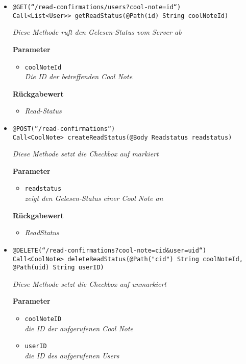     \begin{itemize}
		\item\texttt{{@GET(``/read-confirmations/users?cool-note={id}``) \\ Call<List<User>{}> getReadStatus(@Path(\grqq id\grqq) String coolNoteId)}}

		\textit{Diese Methode ruft den Gelesen-Status vom Server ab}

		\textbf{Parameter} 
			\begin{itemize}
				\item\texttt{coolNoteId}\\
		 		\textit{Die ID der betreffenden Cool Note}
	 		\end{itemize}

		\textbf{Rückgabewert} 
		\begin{itemize}
		\item\textit{Read-Status}
		\end{itemize}

	\item\texttt{{@POST(``/read-confirmations``) \\ Call<CoolNote> createReadStatus(@Body Readstatus readstatus) }}

		\textit{Diese Methode setzt die Checkbox auf markiert}

		\textbf{Parameter} 
			\begin{itemize}
				\item\texttt{readstatus}\\
		 		\textit{zeigt den Gelesen-Status einer Cool Note an}
	 		\end{itemize}

		\textbf{Rückgabewert} 
		\begin{itemize}
		\item\textit{ReadStatus}
		\end{itemize}



	\item\texttt{{@DELETE(``/read-confirmations?cool-note={cid}\&user={uid}``)
\\Call<CoolNote> deleteReadStatus(@Path("cid") String coolNoteId,
			     @Path(\grqq uid\grqq) String userID)}}

		\textit{Diese Methode setzt die Checkbox auf unmarkiert}

		\textbf{Parameter} 
			\begin{itemize}
				\item\texttt{coolNoteID}\\
		 		\textit{die ID der aufgerufenen Cool Note}
		 		\item\texttt{userID}\\
		 		\textit{die ID des aufgerufenen Users}
	 		\end{itemize}
	
	 \end{itemize}



